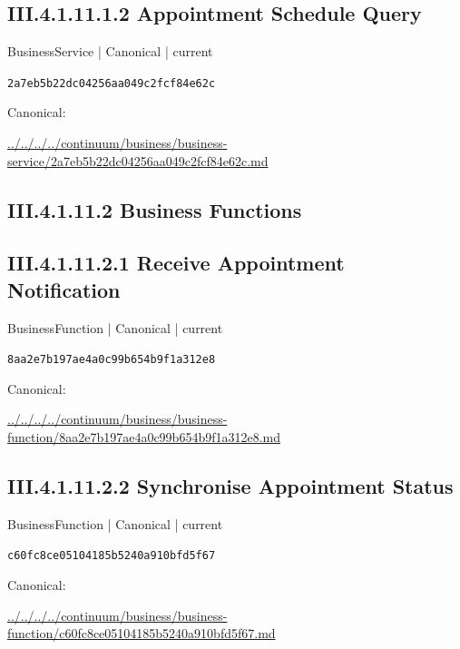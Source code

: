 \documentclass[10pt,a4paper]{article}
\begin{document}
\subsection*{III.4.1.11.1.2 Appointment Schedule Query}
\label{element-2a7eb5b22dc04256aa049c2fcf84e62c}
{\small BusinessService | Canonical | current}\par
\texttt{2a7eb5b22dc04256aa049c2fcf84e62c}\par
Canonical: \par
{\footnotesize\url{../../../../continuum/business/business-service/2a7eb5b22dc04256aa049c2fcf84e62c.md}}\par
\subsection*{III.4.1.11.2 Business Functions}
\subsection*{III.4.1.11.2.1 Receive Appointment Notification}
\label{element-8aa2e7b197ae4a0c99b654b9f1a312e8}
{\small BusinessFunction | Canonical | current}\par
\texttt{8aa2e7b197ae4a0c99b654b9f1a312e8}\par
Canonical: \par
{\footnotesize\url{../../../../continuum/business/business-function/8aa2e7b197ae4a0c99b654b9f1a312e8.md}}\par
\subsection*{III.4.1.11.2.2 Synchronise Appointment Status}
\label{element-c60fc8ce05104185b5240a910bfd5f67}
{\small BusinessFunction | Canonical | current}\par
\texttt{c60fc8ce05104185b5240a910bfd5f67}\par
Canonical: \par
{\footnotesize\url{../../../../continuum/business/business-function/c60fc8ce05104185b5240a910bfd5f67.md}}\par
\end{document}
